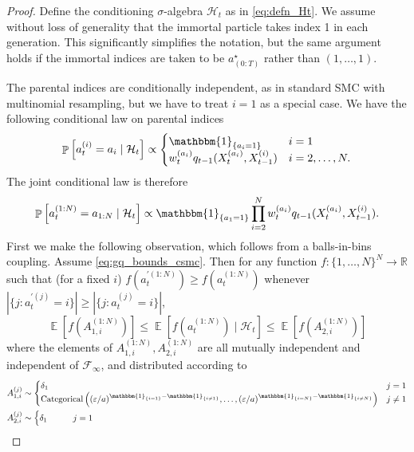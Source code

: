 \documentclass{article} %
\theoremstyle{definition}
\DeclareMathOperator{\Prob}{\mathbb{P}}
\DeclareMathOperator{\E}{\mathbb{E}}
\newcommand{\1}[1]{\mathbbm{1}_{\{#1\}}}
\begin{document}
\begin{proof}
Define the conditioning $\sigma$-algebra $\mathcal{H}_t$ as in \eqref{eq:defn_Ht}.
We assume without loss of generality that the immortal particle takes index 1 in each generation. This significantly simplifies the notation, but the same argument holds if the immortal indices are taken to be $a_{(0:T)}^\star$ rather than $(1,\dots,1)$.

The parental indices are conditionally independent, as in standard SMC with multinomial resampling, but we have to treat $i=1$ as a special case. We have the following conditional law on parental indices
\begin{equation*}
\Prob \left[ a_t^{(i)} = a_i \mid \mathcal{H}_t \right] \propto
\begin{cases}
\1{a_i=1} &i=1 \\
w_t^{(a_i)} q_{t-1}(X_t^{(a_i)}, X_{t-1}^{(i)}) &i=2,\dots,N .
\end{cases}
\end{equation*}
The joint conditional law is therefore
\begin{equation*}
\Prob \left[ a_t^{(1:N)} = a_{1:N} \mid \mathcal{H}_t \right] \propto \1{a_1 = 1} \prod_{i=2}^N w_t^{(a_i)} q_{t-1}(X_t^{(a_i)}, X_{t-1}^{(i)}).
\end{equation*}
First we make the following observation, which follows from a balls-in-bins coupling.
Assume \eqref{eq:gq_bounds_csmc}. 
Then for any function $f:\{1,\dots,N\}^N \to \mathbb{R}$ such that (for a fixed $i$) $f(a_t^{\prime(1:N)}) \geq f(a_t^{(1:N)})$ whenever $|\{j:a_t^{\prime(j)}=i\}| \geq |\{j:a_t^{(j)}=i\}|$,
\begin{equation}\label{eq:csmc_f_bound}
\E[ f(A_{1,i}^{(1:N)}) ] 
\leq \E[ f(a_t^{(1:N)}) \mid \mathcal{H}_t ]
\leq \E[ f(A_{2,i}^{(1:N)}) ] 
\end{equation}
where the elements of $A_{1,i}^{(1:N)}, A_{2,i}^{(1:N)}$ are all mutually independent and independent of $\mathcal{F}_{\infty}$, and distributed according to
\begin{align*}
& A_{1,i}^{(j)} \sim \begin{cases}
\delta_1 \qquad & j=1 \\
\operatorname{Categorical}\left( (\varepsilon/a)^{\1{i=1} -\1{i\neq 1}} ,\dots, (\varepsilon/a)^{\1{i=N} -\1{i\neq N}} \right) & j\neq 1 
\end{cases} \\
& A_{2,i}^{(j)} \sim \begin{cases}
\delta_1 \qquad & j=1\\

\end{cases}
\end{align*}
\end{proof}
\end{document}
